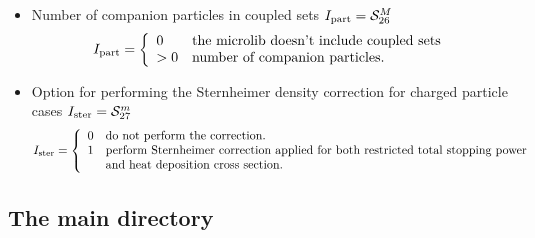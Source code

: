 \begin{itemize}
\begin{displaymath}
\begin{array}{ll}
1 & \textrm{use the fundamental current ${\cal J}$ as weighting function for
scattering cross sections}\\
& \textrm{with order $\ge 1$ and compute both $\phi$-- and
${\cal J}$--weighted total cross sections.}
\end{array} \right.
\end{displaymath}
\item Number of companion particles in coupled sets $I_{\rm part}=\mathcal{S}^{M}_{26}$
\begin{displaymath}
I_{\rm part} = \left\{
\begin{array}{ll}
0 & \textrm{the microlib doesn't include coupled sets}\\
>0 & \textrm{number of companion particles.}
\end{array} \right.
\end{displaymath}
\item Option for performing the Sternheimer density correction for charged particle cases $I_{\rm ster}=\mathcal{S}^{m}_{27}$
\begin{displaymath}
I_{\rm ster} = \left\{
\begin{array}{ll}
0 & \textrm{do not perform the correction.} \\
1 & \textrm{perform Sternheimer correction applied for both restricted total stopping power}\\
& \textrm{and heat deposition cross section.}
\end{array} \right.
\end{displaymath}
\end{itemize}

\goodbreak
\clearpage

\subsection{The main  directory}\label{sect:microlibdirmain}

